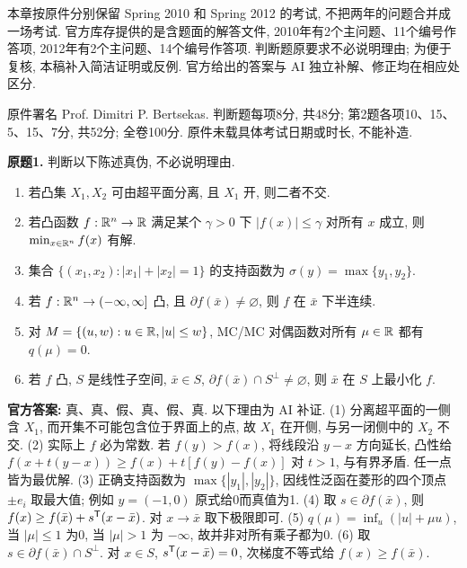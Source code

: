\label{chap:6253-exams}
本章按原件分别保留 Spring 2010 和 Spring 2012 的考试, 不把两年的问题合并成一场考试. 官方库存提供的是含题面的解答文件, 2010年有2个主问题、11个编号作答项, 2012年有2个主问题、14个编号作答项. 判断题原要求不必说明理由; 为便于复核, 本稿补入简洁证明或反例. 官方给出的答案与 AI 独立补解、修正均在相应处区分.

原件署名 Prof. Dimitri P. Bertsekas. 判断题每项8分, 共48分; 第2题各项10、15、5、15、7分, 共52分; 全卷100分. 原件未载具体考试日期或时长, 不能补造.

\begin{exercise}\label{ass:6253-exam2010-q1}
\textbf{原题1.} 判断以下陈述真伪, 不必说明理由.
\begin{enumerate}[label=(\arabic*)]
\item 若凸集 $X_1,X_2$ 可由超平面分离, 且 $X_1$ 开, 则二者不交.
\item 若凸函数 $f:\mathbb R^n\to\mathbb R$ 满足某个 $\gamma>0$ 下 $|f(x)|\le\gamma$ 对所有 $x$ 成立, 则 $\min_{x\in\mathbb R^n}f(x)$ 有解.
\item 集合 $\{(x_1,x_2):|x_1|+|x_2|=1\}$ 的支持函数为 $\sigma(y)=\max\{y_1,y_2\}$.
\item 若 $f:\mathbb R^n\to(-\infty,\infty]$ 凸, 且 $\partial f(\bar x)\ne\varnothing$, 则 $f$ 在 $\bar x$ 下半连续.
\item 对 $M=\{(u,w):u\in\mathbb R,|u|\le w\}$, MC/MC 对偶函数对所有 $\mu\in\mathbb R$ 都有 $q(\mu)=0$.
\item 若 $f$ 凸, $S$ 是线性子空间, $\bar x\in S$, $\partial f(\bar x)\cap S^\perp\ne\varnothing$, 则 $\bar x$ 在 $S$ 上最小化 $f$.
\end{enumerate}
\end{exercise}
\begin{solution}
\textbf{官方答案:} 真、真、假、真、假、真. 以下理由为 AI 补证.
(1) 分离超平面的一侧含 $X_1$, 而开集不可能包含位于界面上的点, 故 $X_1$ 在开侧, 与另一闭侧中的 $X_2$ 不交.
(2) 实际上 $f$ 必为常数. 若 $f(y)>f(x)$, 将线段沿 $y-x$ 方向延长, 凸性给 $f(x+t(y-x))\ge f(x)+t[f(y)-f(x)]$ 对 $t>1$, 与有界矛盾. 任一点皆为最优解.
(3) 正确支持函数为 $\max\{|y_1|,|y_2|\}$, 因线性泛函在菱形的四个顶点 $\pm e_i$ 取最大值; 例如 $y=(-1,0)$ 原式给0而真值为1.
(4) 取 $s\in\partial f(\bar x)$, 则 $f(x)\ge f(\bar x)+s^{\mathsf T}(x-\bar x)$. 对 $x\to\bar x$ 取下极限即可.
(5) $q(\mu)=\inf_u(|u|+\mu u)$, 当 $|\mu|\le1$ 为0, 当 $|\mu|>1$ 为 $-\infty$, 故并非对所有乘子都为0.
(6) 取 $s\in\partial f(\bar x)\cap S^\perp$. 对 $x\in S$, $s^{\mathsf T}(x-\bar x)=0$, 次梯度不等式给 $f(x)\ge f(\bar x)$.
\end{solution}

